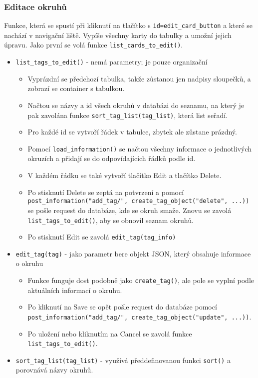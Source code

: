 \documentclass[11pt]{article}
\providecommand{\tightlist}{\setlength{\itemsep}{1pt}\setlength{\parskip}{1pt}}
\let\oldtexttt\texttt
\renewcommand{\texttt}[1]{\oldtexttt{\textcolor{codehighlight}{#1}}}
\begin{document}
\hypertarget{editace-okruhux16f}{%
\subsubsection{Editace okruhů}\label{editace-okruhux16f}}

Funkce, která se spustí při kliknutí na tlačítko s
\texttt{id=edit\_card\_button} a které se nachází v navigační liště.
Vypíše všechny karty do tabulky a umožní jejich úpravu. Jako první se
volá funkce \texttt{list\_cards\_to\_edit()}.

\begin{itemize}
\tightlist
\item
  \texttt{list\_tags\_to\_edit()} - nemá parametry; je pouze organizační

  \begin{itemize}
  \tightlist
  \item
    Vyprázdní se předchozí tabulka, takže zůstanou jen nadpisy
    sloupečků, a zobrazí se container s tabulkou.
  \item
    Načtou se názvy a id všech okruhů v databázi do seznamu, na který je
    pak zavolána funkce \texttt{sort\_tag\_list(tag\_list)}, která list
    seřadí.
  \item
    Pro každé id se vytvoří řádek v tabulce, zbytek ale zůstane prázdný.
  \item
    Pomocí \texttt{load\_information()} se načtou všechny informace o
    jednotlivých okruzích a přidají se do odpovídajících řádků podle id.
  \item
    V každém řádku se také vytvoří tlačítko Edit a tlačítko Delete.
  \item
    Po stisknutí Delete se zeptá na potvrzení a pomocí
    \texttt{post\_information("add\_tag/",\ create\_tag\_object("delete",\ ...))}
    se pošle request do databáze, kde se okruh smaže. Znovu se zavolá
    \texttt{list\_tags\_to\_edit()}, aby se obnovil seznam okruhů.
  \item
    Po stisknutí Edit se zavolá \texttt{edit\_tag(tag\_info)}
  \end{itemize}
\item
  \texttt{edit\_tag(tag)} - jako parametr bere objekt JSON, který
  obsahuje informace o okruhu

  \begin{itemize}
  \tightlist
  \item
    Funkce funguje dost podobně jako \texttt{create\_tag()}, ale pole se
    vyplní podle aktuálních informací o okruhu.
  \item
    Po kliknutí na Save se opět pošle request do databáze pomocí
    \texttt{post\_information("add\_tag/",\ create\_tag\_object("update",\ ...))}.
  \item
    Po uložení nebo kliknutím na Cancel se zavolá funkce
    \texttt{list\_tags\_to\_edit()}.
  \end{itemize}
\item
  \texttt{sort\_tag\_list(tag\_list)} - využívá předdefinovanou funkci
  \texttt{sort()} a porovnává názvy okruhů.
\end{itemize}
\end{document}
